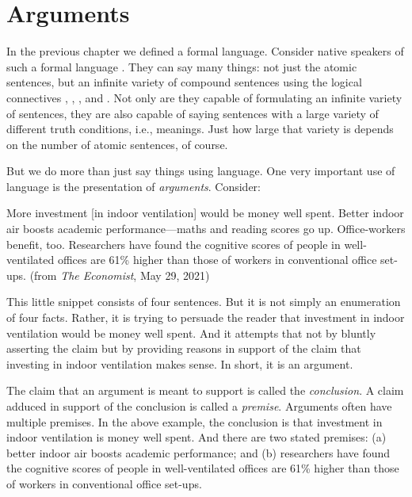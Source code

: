 

\section{Arguments}\label{sec:derivation intro 2}

In the previous chapter we defined a formal language. Consider native speakers 
of such a formal language \lL{}. They can say many things: not just the atomic 
sentences, but an infinite variety of compound sentences using the logical 
connectives \p{\lnot}, \p{\land}, \p{\lor}, and \p{\limplies}. Not only are they 
capable of formulating an infinite variety of sentences, they are also capable 
of saying sentences with a large variety of different truth conditions, i.e., 
meanings.  Just how large that variety is depends on the number of atomic 
sentences, of course. 

But we do more than just say things using language. One very important use of 
language is the presentation of \emph{arguments}. Consider:

\begin{Example}\label{ex:econo-1}

More investment [in indoor ventilation] would be money well spent. Better indoor 
air boosts academic performance---maths and reading scores go up. Office-workers 
benefit, too. Researchers have found the cognitive scores of people in 
well-ventilated offices are 61\% higher than those of workers in conventional 
office set-ups. (from \emph{The Economist},  May 29, 2021)

\end{Example}

This little snippet consists of four sentences. But it is not simply an 
enumeration of four facts. Rather, it is trying to persuade the reader that 
investment in indoor ventilation would be money well spent. And it attempts that 
not by bluntly asserting the claim but by providing reasons in support of the 
claim that investing in indoor ventilation makes sense. In short, it is an 
argument. 

The claim that an argument is meant to support is called the \emph{conclusion}.  
A claim adduced in support of the conclusion is called a \emph{premise}.  
Arguments often have multiple premises. In the above example, the conclusion is 
that investment in indoor ventilation is money well spent. And there are two 
stated premises: (a) better indoor air boosts academic performance; and (b)
 researchers have found the cognitive scores of people in well-ventilated 
 offices are 61\% higher than those of workers in conventional office set-ups.

